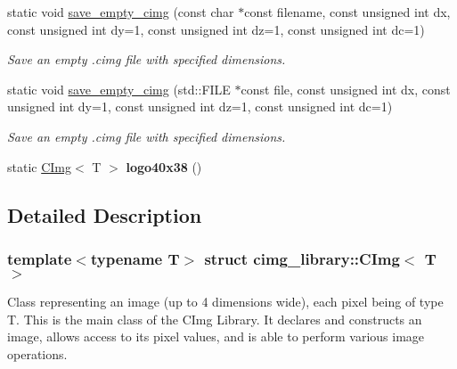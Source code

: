 \begin{DoxyCompactItemize}
\item 
\hypertarget{structcimg__library_1_1CImg_a6be9b90fe347cd59875682a4b80c24cc}{
static void \hyperlink{structcimg__library_1_1CImg_a6be9b90fe347cd59875682a4b80c24cc}{save\_\-empty\_\-cimg} (const char $\ast$const filename, const unsigned int dx, const unsigned int dy=1, const unsigned int dz=1, const unsigned int dc=1)}
\label{structcimg__library_1_1CImg_a6be9b90fe347cd59875682a4b80c24cc}

\begin{DoxyCompactList}\small\item\em Save an empty .cimg file with specified dimensions. \item\end{DoxyCompactList}\item 
\hypertarget{structcimg__library_1_1CImg_a2b1c9c930bba551167e332f23fd04a9b}{
static void \hyperlink{structcimg__library_1_1CImg_a2b1c9c930bba551167e332f23fd04a9b}{save\_\-empty\_\-cimg} (std::FILE $\ast$const file, const unsigned int dx, const unsigned int dy=1, const unsigned int dz=1, const unsigned int dc=1)}
\label{structcimg__library_1_1CImg_a2b1c9c930bba551167e332f23fd04a9b}

\begin{DoxyCompactList}\small\item\em Save an empty .cimg file with specified dimensions. \item\end{DoxyCompactList}\item 
\hypertarget{structcimg__library_1_1CImg_af0c1cb65799c88c02a855976b783c248}{
static \hyperlink{structcimg__library_1_1CImg}{CImg}$<$ T $>$ {\bfseries logo40x38} ()}
\label{structcimg__library_1_1CImg_af0c1cb65799c88c02a855976b783c248}

\end{DoxyCompactItemize}


\subsection{Detailed Description}
\subsubsection*{template$<$typename T$>$ struct cimg\_\-library::CImg$<$ T $>$}

Class representing an image (up to 4 dimensions wide), each pixel being of type {\ttfamily T}. This is the main class of the CImg Library. It declares and constructs an image, allows access to its pixel values, and is able to perform various image operations.

